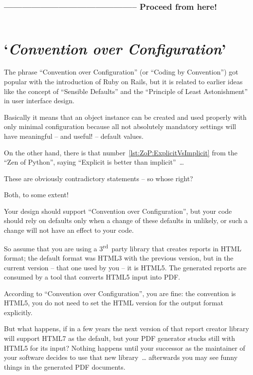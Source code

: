 \documentclass[11pt,a4paper, titlepage, parskip=half, headsepline, footsepline, cleardoublepage=current, headheight=1cm]{scrbook}
\begin{document}
\subsubsection{-------------------------------------------- Proceed from here!}
\autocite{APIGUARDIAN}
\autocite{APIGUARDIAN:API}
\lipsum[1]

\begin{lstlisting}
\end{lstlisting}

\section{‘\textit{Convention over Configuration}’}
The phrase “Convention over Configuration” (or “Coding by Convention”) got popular with the introduction of Ruby on Rails, but it is related to earlier ideas like the concept of “Sensible Defaults” and the “Principle of Least Astonishment” in user interface design.

Basically it means that an object instance can be created and used properly with only minimal configuration because all not absolutely mandatory settings will have meaningful – and useful! – default values.

On the other hand, there is that number~\ref{lst:ZoP:ExplicitVsImplicit} from the “Zen of Python”, saying “Explicit is better than implicit”~…

These are obviously contradictory statements – so whose right?

Both, to some extent!

Your design should support “Convention over Configuration”, but your code should rely on defaults only when a change of these defaults in unlikely, or such a change will not have an effect to your code.

So assume that you are using a 3\textsuperscript{rd}~party library that creates reports in HTML format; the default format was HTML3 with the previous version, but in the current version – that one used by you – it is HTML5. The generated reports are consumed by a tool that converts HTML5 input into PDF.

According to “Convention over Configuration”, you are fine: the convention is HTML5, you do not need to set the HTML version for the output format explicitly.

But what happens, if in a few years the next version of that report creator library will support HTML7 as the default, but your PDF generator stucks still with HTML5 for its input? Nothing happens until your successor as the maintainer of your software decides to use that new library~… afterwards you may see funny things in the generated PDF documents.
\end{document}
